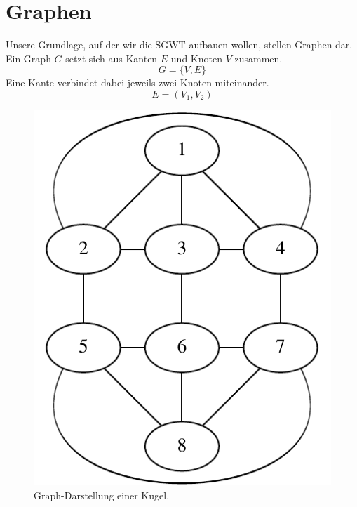 \section{Graphen\label{sec:sgwt:graphs}}

Unsere Grundlage, auf der wir die SGWT aufbauen wollen, stellen Graphen dar. 
Ein Graph $G$ setzt sich aus Kanten $E$ und Knoten $V$ zusammen.
\begin{equation*}
G = \{V, E\}
\end{equation*}
Eine Kante verbindet dabei jeweils zwei Knoten miteinander.
\begin{equation*}
E = (V_1, V_2)
\end{equation*}

\begin{figure}
    \centering
    \includegraphics{papers/sgwt/images/sphere-graph.pdf}
    \caption{Graph-Darstellung einer Kugel. \label{sgwt:sphere:graph}}
\end{figure}
